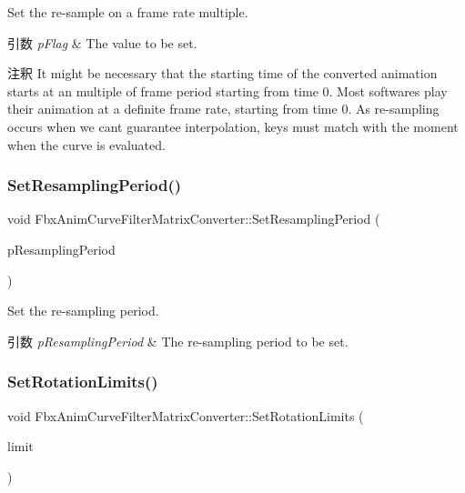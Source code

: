Set the re-\/sample on a frame rate multiple. 
\begin{DoxyParams}{引数}
{\em p\+Flag} & The value to be set. \\
\hline
\end{DoxyParams}
\begin{DoxyRemark}{注釈}
It might be necessary that the starting time of the converted animation starts at an multiple of frame period starting from time 0. Most softwares play their animation at a definite frame rate, starting from time 0. As re-\/sampling occurs when we can\textquotesingle{}t guarantee interpolation, keys must match with the moment when the curve is evaluated. 
\end{DoxyRemark}
\mbox{\label{class_fbx_anim_curve_filter_matrix_converter_ad32f07496ccaa59ed3fa575da58b5dc1}} 
\subsubsection{\texorpdfstring{Set\+Resampling\+Period()}{SetResamplingPeriod()}}
{\footnotesize\ttfamily void Fbx\+Anim\+Curve\+Filter\+Matrix\+Converter\+::\+Set\+Resampling\+Period (\begin{DoxyParamCaption}\item[{\hyperlink{class_fbx_time}{Fbx\+Time} \&}]{p\+Resampling\+Period }\end{DoxyParamCaption})}

Set the re-\/sampling period. 
\begin{DoxyParams}{引数}
{\em p\+Resampling\+Period} & The re-\/sampling period to be set. \\
\hline
\end{DoxyParams}
\mbox{\label{class_fbx_anim_curve_filter_matrix_converter_a95cad4a51f2204a7c5cce101486eaab6}} 
\subsubsection{\texorpdfstring{Set\+Rotation\+Limits()}{SetRotationLimits()}}
{\footnotesize\ttfamily void Fbx\+Anim\+Curve\+Filter\+Matrix\+Converter\+::\+Set\+Rotation\+Limits (\begin{DoxyParamCaption}\item[{\hyperlink{class_fbx_limits}{Fbx\+Limits} \&}]{limit }\end{DoxyParamCaption})}


